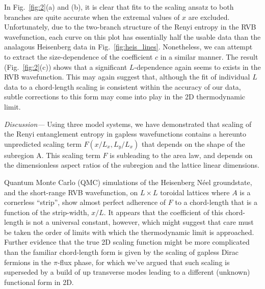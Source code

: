 \documentclass[prl,aps,twocolumn,floatfix,amsmath,amssymb,superscriptaddress,tightenlines]{revtex4}
\begin{document}
In Fig.~{\ref{fig:2}}(a) and (b), it is clear that fits to the scaling ansatz to both branches are quite accurate when the extremal values of $x$ are excluded.   Unfortunately, due to the two-branch structure of the Renyi entropy in the RVB wavefunction, each curve on this plot has essentially half the usable data than the analagous Heisenberg data in Fig.~\ref{fig:heis_lines}.  Nonetheless, we can attempt to extract the size-dependence of the coefficient $c$ in a similar manner.  The result (Fig.~\ref{fig:2}(c)) shows that a significant $L$-dependence again seems to exists in the RVB wavefunction.  This may again suggest that, although the fit of individual $L$ data to a chord-length scaling is consistent within the accuracy of our data, subtle corrections to this form may come into play in the 2D thermodynamic limit.

{\it Discussion---} Using three model systems, we have demonstrated that scaling of the Renyi entanglement entropy in gapless wavefunctions contains a hereunto unpredicted scaling term $F(x/L_x,L_y/L_x)$ that depends on the shape of the subregion A.  This scaling term $F$ is subleading to the area law, and depends on the dimensionless aspect ratios of the subregion and the lattice linear dimensions.

Quantum Monte Carlo (QMC) simulations of the Heisenberg N\'eel groundstate, and the short-range RVB wavefunction, on $L \times L$ toroidal lattices where $A$ is a cornerless ``strip'', show almost perfect adherence of $F$ to a chord-length that is a function of the strip-width, $x/L$.
It appears that the coefficient of this chord-length is not a universal constant, however, which might suggest that care must be taken the order of limits with which the thermodynamic limit is approached.  Further evidence that the true 2D scaling function might be more complicated than the familiar chord-length form is given by the scaling of gapless Dirac fermions in the $\pi$-flux phase, for which we've argued that such scaling is superseded by a build of up transverse modes leading to a different (unknown) functional form in 2D.
\end{document}
